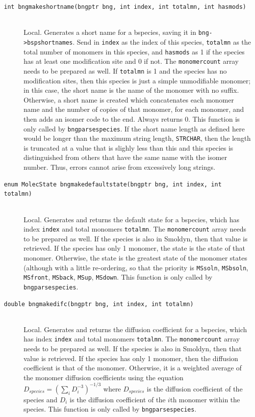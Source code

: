 \documentclass {scrbook}
\newcommand {\ttt} {\texttt}
\begin{document}
\begin{description}
\item[\ttt{int bngmakeshortname(bngptr bng, int index, int totalmn, int hasmods)}]
\hfill \\
Local. Generates a short name for a bspecies, saving it in \ttt{bng->bspshortnames}. Send in \ttt{index} as the index of this species, \ttt{totalmn} as the total number of monomers in this species, and \ttt{hasmods} as 1 if the species has at least one modification site and 0 if not. The \ttt{monomercount} array needs to be prepared as well. If \ttt{totalmn} is 1 and the species has no modification sites, then this species is just a simple unmodifiable monomer; in this case, the short name is the name of the monomer with no suffix. Otherwise, a short name is created which concatenates each monomer name and the number of copies of that monomer, for each monomer, and then adds an isomer code to the end. Always returns 0. This function is only called by \ttt{bngparsespecies}. If the short name length as defined here would be longer than the maximum string length, \ttt{STRCHAR}, then the length is truncated at a value that is slighly less than this and this species is distinguished from others that have the same name with the isomer number. Thus, errors cannot arise from excessively long strings.

\item[\ttt{enum MolecState bngmakedefaultstate(bngptr bng, int index, int totalmn)}]
\hfill \\
Local. Generates and returns the default state for a bspecies, which has index \ttt{index} and total monomers \ttt{totalmn}. The \ttt{monomercount} array needs to be prepared as well. If the species is also in Smoldyn, then that value is retrieved. If the species has only 1 monomer, the state is the state of that monomer. Otherwise, the state is the greatest state of the monomer states (although with a little re-ordering, so that the priority is \ttt{MSsoln}, \ttt{MSbsoln}, \ttt{MSfront}, \ttt{MSback}, \ttt{MSup}, \ttt{MSdown}. This function is only called by \ttt{bngparsespecies}.

\item[\ttt{double bngmakedifc(bngptr bng, int index, int totalmn)}]
\hfill \\
Local. Generates and returns the diffusion coefficient for a bspecies, which has index \ttt{index} and total monomers \ttt{totalmn}. The \ttt{monomercount} array needs to be prepared as well. If the species is also in Smoldyn, then that value is retrieved. If the species has only 1 monomer, then the diffusion coefficient is that of the monomer. Otherwise, it is a weighted average of the monomer diffusion coefficients using the equation
$D_{species} = (\sum_{i} D_i^{-3})^{-1/3}$
where $D_{species}$ is the diffusion coefficient of the species and $D_i$ is the diffusion coefficient of the $i$th monomer within the species. This function is only called by \ttt{bngparsespecies}.


\end{description}
\end{document}
